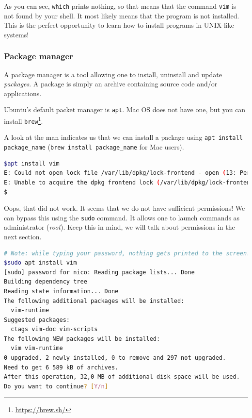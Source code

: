 \documentclass[12pt]{article}
\begin{document}
As you can see, \texttt{which} prints nothing, so that means that the command \texttt{vim} is not found by your shell. It most likely means that the program is not installed.
This is the perfect opportunity to learn how to install programs in UNIX-like systems!

\subsubsection{Package manager}

A package manager is a tool allowing one to install, uninstall and update \textit{packages}.
A package is simply an archive containing source code and/or applications.

Ubuntu's default packet manager is \texttt{apt}. Mac OS does not have one, but you can install \texttt{brew}\footnote{\url{https://brew.sh/}}.


A look at the man indicates us that we can install a package using \texttt{apt install package\_name} (\texttt{brew install package\_name} for Mac users).

\begin{lstlisting}[language=bash]
$apt install vim
E: Could not open lock file /var/lib/dpkg/lock-frontend - open (13: Permission denied)
E: Unable to acquire the dpkg frontend lock (/var/lib/dpkg/lock-frontend), are you root?
$
\end{lstlisting}

Oops, that did not work. It seems that we do not have sufficient permissions! We can bypass this using the \texttt{sudo} command. It allows one to launch commands as administrator (\textit{root}). Keep this in mind, we will talk about permissions in the next section.

\begin{lstlisting}[language=bash]
# Note: while typing your password, nothing gets printed to the screen. Don't panic, that's normal, simply type your password and hit enter :)
$sudo apt install vim
[sudo] password for nico: Reading package lists... Done
Building dependency tree       
Reading state information... Done
The following additional packages will be installed:
  vim-runtime
Suggested packages:
  ctags vim-doc vim-scripts
The following NEW packages will be installed:
  vim vim-runtime
0 upgraded, 2 newly installed, 0 to remove and 297 not upgraded.
Need to get 6 589 kB of archives.
After this operation, 32,0 MB of additional disk space will be used.
Do you want to continue? [Y/n]
\end{lstlisting}
\end{document}
